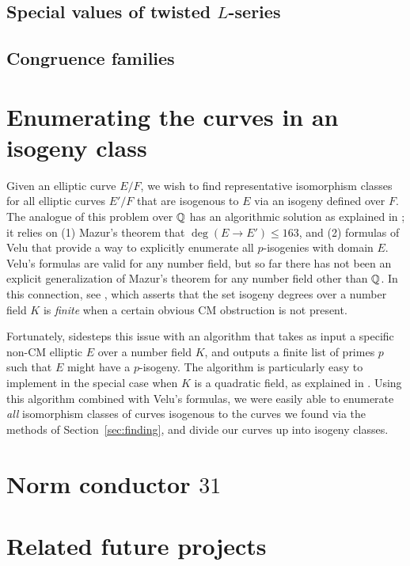 \documentclass{amsart}
\begin{document}
\subsection{Special values of twisted $L$-series}

\subsection{Congruence families}



\section{Enumerating the curves in an isogeny class}\label{sec:isoclass}

Given an elliptic curve $E/F$, we wish to find representative
isomorphism classes for all elliptic curves $E'/F$ that are isogenous
to $E$ via an isogeny defined over $F$.  The analogue of this problem
over $\mathbb{Q}$ has an algorithmic solution as explained in
\cite[\S3.8]{cremona:algs}; it relies on (1) Mazur's theorem
\cite{mazur:rational} that $\deg(E\to E')\leq 163$, and (2) formulas
of Velu \cite{velu:isogenies} that provide a way to explicitly
enumerate all $p$-isogenies with domain $E$.  Velu's formulas are
valid for any number field, but so far there has not been an explicit
generalization of Mazur's theorem for any number field other than
$\mathbb{Q}$.  In this connection, see \cite{}, which asserts that the set
isogeny degrees over a number field $K$ is {\em finite} when a certain
obvious CM obstruction is not present.

Fortunately, \cite{billerey:isog} sidesteps this issue with an
algorithm that takes as input a specific non-CM elliptic $E$ over a
number field $K$, and outputs a finite list of primes $p$ such that
$E$ might have a $p$-isogeny.  The algorithm is particularly easy to
implement in the special case when $K$ is a quadratic field, as
explained in \cite[\S2.3.4]{billerey:isog}.  Using this algorithm
combined with Velu's formulas, we were easily able to enumerate {\em
  all} isomorphism classes of curves isogenous to the curves we found
via the methods of Section~\ref{sec:finding}, and divide our curves up into
isogeny classes.


\section{Norm conductor $31$}\label{sec:31}

\section{Related future projects}\label{sec:future}
\end{document}

